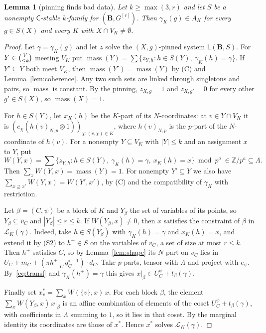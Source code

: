 \documentclass[11pt]{article}
\newtheorem{lemma}[theorem]{Lemma}
\theoremstyle{definition}
\theoremstyle{remark}
\newcommand{\Coh}{\mathsf{C}}
\newcommand{\sub}[2]{\tbinom{#1}{\le #2}}
\newcommand{\Z}{\mathbb Z}
\newcommand{\mass}{\operatorname{mass}}
\newcommand{\cL}{\mathcal L}
\begin{document}
\begin{lemma}[pinning finds bad data]\label{lem:pinning}
Let $k\ge\max(3,r)$ and let $S$ be a nonempty $\Coh$-stable $k$-family for
$(\mathbf B,G^{[r]})$. Then $\gamma_K(g)\in A_K$ for every $g\in S(X)$ and every
$K$ with $X\cap V_K\neq\emptyset$.
\end{lemma}
\begin{proof}
Let $\gamma=\gamma_K(g)$ and let $z$ solve the $(X,g)$-pinned system $\mathsf
L(\mathbf B,S)$. For $Y\in\sub Vk$ meeting $V_K$ put
$\mass(Y)=\sum\{z_{Y,h}:h\in S(Y),\ \gamma_K(h)=\gamma\}$. If $Y'\subseteq Y$ both
meet $V_K$, then $\mass(Y')=\mass(Y)$ by (C) and Lemma~\ref{lem:coherence}. Any
two such sets are linked through singletons and pairs, so $\mass$ is constant.
By the pinning, $z_{X,g}=1$ and $z_{X,g'}=0$ for every other $g'\in S(X)$, so
$\mass(X)=1$.

For $h\in S(Y)$, let $x_K(h)$ be the $K$-part of its $N$-coordinates: at $v\in
Y\cap V_K$ it is $(e_\chi(h(v)_{N,p}\otimes1))_{\chi:(v,\chi)\in K}$, where
$h(v)_{N,p}$ is the $p$-part of the $N$-coordinate of $h(v)$. For a nonempty
$Y\subseteq V_K$ with $|Y|\le k$ and an assignment $x$ to $Y$, put
\[
W(Y,x)=\textstyle\sum\{z_{Y,h}:h\in S(Y),\ \gamma_K(h)=\gamma,\ x_K(h)=x\}\bmod p^a
\ \in\Z/p^a\subseteq\Lambda .
\]
Then $\sum_xW(Y,x)=\mass(Y)=1$. For nonempty $Y'\subseteq Y$ we also have
$\sum_{x\supseteq x'}W(Y,x)=W(Y',x')$, by (C) and the compatibility of $\gamma_K$
with restriction.

Let $\beta=(C,\psi)$ be a block of $K$ and $Y_\beta$ the set of variables of its
points, so $Y_\beta\subseteq\bar v_C$ and $|Y_\beta|\le r\le k$. If
$W(Y_\beta,x)\ne0$, then $x$ satisfies the constraint of $\beta$ in
$\cL_K(\gamma)$. Indeed, take $h\in S(Y_\beta)$ with $\gamma_K(h)=\gamma$ and
$x_K(h)=x$, and extend it by (S2) to $h^+\in S$ on the variables of $\bar v_C$, a
set of size at most $r\le k$. Then $h^+$ satisfies $C$, so by
Lemma~\ref{lem:shape} its $N$-part on $\bar v_C$ lies in
$U_C+m_C+(\pi h^+|_C\,q^{\circ-1}_C)\cdot d_C$. Take $p$-parts, tensor with
$\Lambda$ and project with $e_\psi$. By~\eqref{eq:transl} and
$\gamma_K(h^+)=\gamma$ this gives $x|_\beta\in U_C^\psi+t_\beta(\gamma)$.

Finally set $x^*_v=\sum_xW(\{v\},x)\,x$. For each block $\beta$, the element
$\sum_xW(Y_\beta,x)\,x|_\beta$ is an affine combination of elements of the coset
$U_C^\psi+t_\beta(\gamma)$, with coefficients in $\Lambda$ summing to $1$, so it
lies in that coset. By the marginal identity its coordinates are those of $x^*$.
Hence $x^*$ solves $\cL_K(\gamma)$.
\end{proof}
\end{document}
